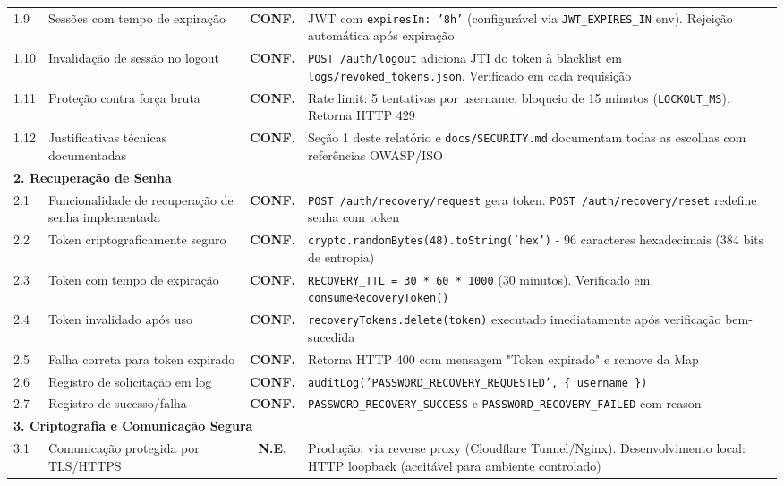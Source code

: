 \documentclass[11pt, a4paper]{article}
\newcommand{\conf}{\textcolor{conf}{\textbf{CONF.}}}
\newcommand{\neve}{\textcolor{ne}{\textbf{N.E.}}}
\begin{document}
\begin{longtable}{p{0.8cm}p{5.5cm}cp{8.2cm}}
1.9 & Sessões com tempo de expiração & \conf & JWT com \texttt{expiresIn: '8h'} (configurável via \texttt{JWT\_EXPIRES\_IN} env). Rejeição automática após expiração \\
1.10 & Invalidação de sessão no logout & \conf & \texttt{POST /auth/logout} adiciona JTI do token à blacklist em \texttt{logs/revoked\_tokens.json}. Verificado em cada requisição \\
1.11 & Proteção contra força bruta & \conf & Rate limit: 5 tentativas por username, bloqueio de 15 minutos (\texttt{LOCKOUT\_MS}). Retorna HTTP 429 \\
1.12 & Justificativas técnicas documentadas & \conf & Seção 1 deste relatório e \texttt{docs/SECURITY.md} documentam todas as escolhas com referências OWASP/ISO \\
\midrule
\multicolumn{4}{l}{\textbf{2. Recuperação de Senha}} \\
\midrule
2.1 & Funcionalidade de recuperação de senha implementada & \conf & \texttt{POST /auth/recovery/request} gera token. \texttt{POST /auth/recovery/reset} redefine senha com token \\
2.2 & Token criptograficamente seguro & \conf & \texttt{crypto.randomBytes(48).toString('hex')} - 96 caracteres hexadecimais (384 bits de entropia) \\
2.3 & Token com tempo de expiração & \conf & \texttt{RECOVERY\_TTL = 30 * 60 * 1000} (30 minutos). Verificado em \texttt{consumeRecoveryToken()} \\
2.4 & Token invalidado após uso & \conf & \texttt{recoveryTokens.delete(token)} executado imediatamente após verificação bem-sucedida \\
2.5 & Falha correta para token expirado & \conf & Retorna HTTP 400 com mensagem "Token expirado" e remove da Map \\
2.6 & Registro de solicitação em log & \conf & \texttt{auditLog('PASSWORD\_RECOVERY\_REQUESTED', \{ username \})} \\
2.7 & Registro de sucesso/falha & \conf & \texttt{PASSWORD\_RECOVERY\_SUCCESS} e \texttt{PASSWORD\_RECOVERY\_FAILED} com reason \\
\midrule
\multicolumn{4}{l}{\textbf{3. Criptografia e Comunicação Segura}} \\
\midrule
3.1 & Comunicação protegida por TLS/HTTPS & \neve & Produção: via reverse proxy (Cloudflare Tunnel/Nginx). Desenvolvimento local: HTTP loopback (aceitável para ambiente controlado) \\

\end{longtable}
\end{document}
